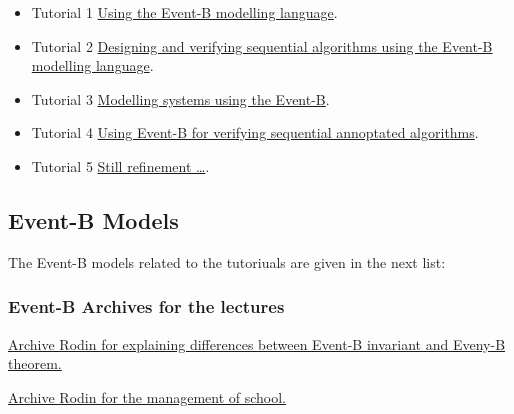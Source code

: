 \documentclass[ 12pt]{article}
\begin{document}
  \begin{itemize}
  \item[]   Tutorial 1
    \href{http://mery54.github.io/teaching/mosos/lecturesnotes/master-tutorial1.pdf}{Using 
      the Event-B modelling language}.

     \item[]   Tutorial 2
    \href{http://mery54.github.io/teaching/mosos/lecturesnotes/master-tutorial2.pdf}{
      Designing and verifying sequential algorithms using the Event-B
      modelling language}.

        \item[]   Tutorial 3
    \href{http://mery54.github.io/teaching/mosos/lecturesnotes/master-tutorial3.pdf}{
      Modelling   systems  using the Event-B}.

   \item[]   Tutorial 4
    \href{http://mery54.github.io/teaching/mosos/lecturesnotes/master-tutorial4.pdf}{
      Using  Event-B  for  verifying sequential  annoptated algorithms}.


  
   \item[]   Tutorial 5
    \href{http://mery54.github.io/teaching/mosos/lecturesnotes/master-tutorial5.pdf}{
      Still refinement \ldots}.

  
    
  \end{itemize}



  \subsection{Event-B Models}
\label{sec:event-b-models}


The Event-B models related to the tutoriuals are given in the next list: 

\subsubsection{Event-B Archives for the  lectures}

 \href{http://mery54.github.io/teaching/mosos/lecturesnotes/
   ex-safety.zip}{Archive Rodin  for  explaining differences between
   Event-B invariant and Eveny-B theorem. }


 
 \href{http://mery54.github.io/teaching/mosos/lecturesnotes/
   ex-school.zip}{Archive Rodin  for   the management of school. }
  
\end{document}

